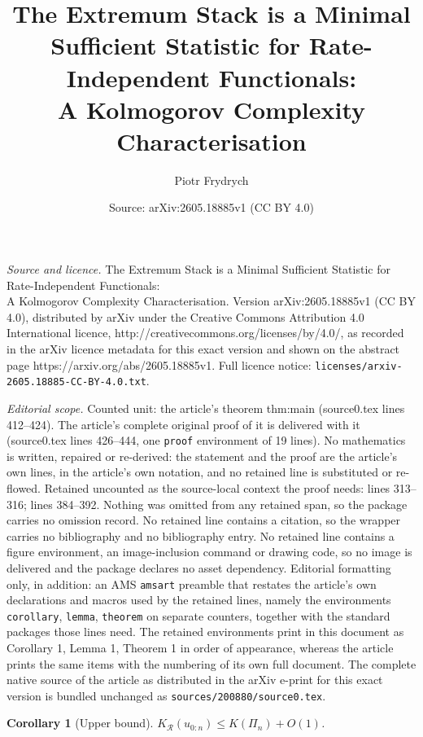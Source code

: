 \documentclass[10pt,a4paper]{amsart}
\title{The Extremum Stack is a Minimal Sufficient Statistic for Rate-Independent Functionals:\\ A Kolmogorov Complexity Characterisation}
\author{Piotr Frydrych}
\date{Source: arXiv:2605.18885v1 (CC BY 4.0)}
\newtheorem{corollary}{Corollary}
\newcommand{\R}{\mathcal{R}}
\newcommand{\stack}{\Pi}
\begin{document}
\maketitle

\noindent\emph{Source and licence.} The Extremum Stack is a Minimal Sufficient Statistic for Rate-Independent Functionals:\\ A Kolmogorov Complexity Characterisation. Version arXiv:2605.18885v1 (CC BY 4.0), distributed by arXiv under the Creative Commons Attribution 4.0 International licence, http://creativecommons.org/licenses/by/4.0/, as recorded in the arXiv licence metadata for this exact version and shown on the abstract page https://arxiv.org/abs/2605.18885v1. Full licence notice: \texttt{licenses/arxiv-2605.18885-CC-BY-4.0.txt}.\par\smallskip

\noindent\textit{Editorial scope.} Counted unit: the article's theorem thm:main (source0.tex lines 412--424). The article's complete original proof of it is delivered with it (source0.tex lines 426--444, one \texttt{proof} environment of 19 lines). No mathematics is written, repaired or re-derived: the statement and the proof are the article's own lines, in the article's own notation, and no retained line is substituted or re-flowed.  Retained uncounted as the source-local context the proof needs: lines 313--316; lines 384--392.  Nothing was omitted from any retained span, so the package carries no omission record.  No retained line contains a citation, so the wrapper carries no bibliography and no bibliography entry.  No retained line contains a figure environment, an image-inclusion command or drawing code, so no image is delivered and the package declares no asset dependency.  Editorial formatting only, in addition: an AMS \texttt{amsart} preamble that restates the article's own declarations and macros used by the retained lines, namely the environments \texttt{corollary}, \texttt{lemma}, \texttt{theorem} on separate counters, together with the standard packages those lines need.  The retained environments print in this document as Corollary 1, Lemma 1, Theorem 1 in order of appearance, whereas the article prints the same items with the numbering of its own full document.  The complete native source of the article as distributed in the arXiv e-print for this exact version is bundled unchanged as \texttt{sources/200880/source0.tex}.
\begin{corollary}[Upper bound]
\label{cor:upper}
$K_{\R}(u_{0:n}) \leq K(\stack_n) + O(1)$.
\end{corollary}
\end{document}
